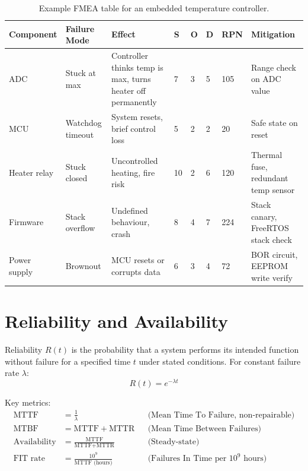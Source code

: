 \begin{table}[H]
\centering
\caption{Example FMEA table for an embedded temperature controller.}
\label{tab:ana:fmea}
\footnotesize
\begin{tabularx}{\linewidth}{@{}p{1.8cm}p{2.2cm}Xp{0.6cm}p{0.6cm}p{0.6cm}p{0.8cm}X@{}}
\toprule
\textbf{Component} & \textbf{Failure Mode} & \textbf{Effect} & \textbf{S} & \textbf{O} & \textbf{D} & \textbf{RPN} & \textbf{Mitigation} \\
\midrule
ADC & Stuck at max & Controller thinks temp is max, turns heater off permanently & 7 & 3 & 5 & 105 & Range check on ADC value \\
MCU & Watchdog timeout & System resets, brief control loss & 5 & 2 & 2 & 20 & Safe state on reset \\
Heater relay & Stuck closed & Uncontrolled heating, fire risk & 10 & 2 & 6 & 120 & Thermal fuse, redundant temp sensor \\
Firmware & Stack overflow & Undefined behaviour, crash & 8 & 4 & 7 & 224 & Stack canary, FreeRTOS stack check \\
Power supply & Brownout & MCU resets or corrupts data & 6 & 3 & 4 & 72 & BOR circuit, EEPROM write verify \\
\bottomrule
\end{tabularx}
\end{table}

\section{Reliability and Availability}
\label{sec:ana:reliability}

\begin{definition}[Reliability]
Reliability $R(t)$ is the probability that a system performs its intended function without failure for a specified time $t$ under stated conditions. For constant failure rate $\lambda$:
\[
R(t) = e^{-\lambda t}
\]
\end{definition}

Key metrics:
\begin{align}
\text{MTTF} &= \frac{1}{\lambda} & &\text{(Mean Time To Failure, non-repairable)} \\
\text{MTBF} &= \text{MTTF} + \text{MTTR} & &\text{(Mean Time Between Failures)} \\
\text{Availability} &= \frac{\text{MTTF}}{\text{MTTF} + \text{MTTR}} & &\text{(Steady-state)} \\
\text{FIT rate} &= \frac{10^9}{\text{MTTF (hours)}} & &\text{(Failures In Time per $10^9$ hours)}
\end{align}

